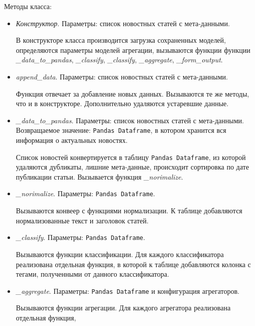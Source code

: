Методы класса:
\begin{itemize}
    \item \textit{Конструктор}. Параметры: список новостных статей с мета-данными.

    В конструкторе класса производится загрузка сохраненных моделей, определяются параметры моделей агрегации, вызываются функции 
    функции \textit{\_data\_to\_pandas}, \textit{\_classify}, \textit{\_classify}, \textit{\_aggregate}, \textit{\_form\_output}.

    \item \textit{append\_data}. Параметры: список новостных статей с мета-данными.

    Функция отвечает за добавление новых данных. Вызываются те же методы, что и
    в конструкторе. Дополнительно удаляются устаревшие данные.

    \item \textit{\_data\_to\_pandas}. Параметры: список новостных статей с мета-данными. Возвращаемое значение: \verb|Pandas Dataframe|, в котором хранится
    вся информация о актуальных новостях.

    Список новостей конвертируется в таблицу \verb|Pandas Dataframe|, из которой
    удаляются дубликаты, лишние мета-данные, происходит сортировка по дате 
    публикации статьи. Вызывается функция \textit{\_norimalize}.

    \item \textit{\_norimalize}. Параметры: \verb|Pandas Dataframe|.

    Вызываются конвеер с функциями нормализации. К таблице
    добавляются нормализованные текст и заголовок статей.

    \item \textit{\_classify}. Параметры: \verb|Pandas Dataframe|.

    Вызываются функции классификации. Для каждого классификатора реализована отдельная функция, в которой к таблице добавляются колонка с тегами,
    полученными от данного классификатора.

    \item \textit{\_aggregate}. Параметры: \verb|Pandas Dataframe| и 
    конфигурация агрегаторов.

    Вызываются функции агрегации. Для каждого агрегатора реализована отдельная функция, 
\end{itemize}
